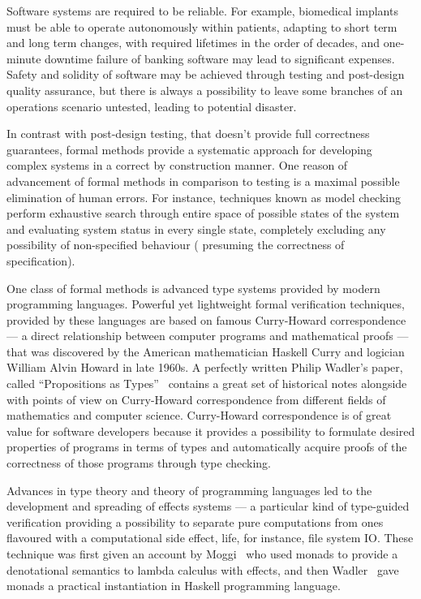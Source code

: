 \Intro

Software systems are required to be reliable. For example, biomedical implants must be able to operate autonomously within patients, adapting to short term and long term changes, with required lifetimes in the order of decades, and one-minute downtime failure of banking software may lead to significant expenses. Safety and solidity of software may be achieved through testing and post-design quality assurance, but there is always a possibility to leave some branches of an operations scenario untested, leading to potential disaster.

In contrast with post-design testing, that doesn’t provide full
correctness guarantees, formal methods provide a systematic approach for developing complex systems in a correct by construction manner. One reason of advancement of
formal methods in comparison to testing is a maximal possible elimination of human errors. For instance, techniques known as model checking perform exhaustive search
through entire space of possible states of the system and evaluating system status in
every single state, completely excluding any possibility of non-specified behaviour (
presuming the correctness of specification).

One class of formal methods is advanced type systems provided by modern programming languages. Powerful yet lightweight formal verification techniques, provided by these languages are based on famous Curry-Howard correspondence --- a direct relationship between computer programs and mathematical
proofs --- that was discovered by the American mathematician Haskell Curry and logician
William Alvin Howard in late 1960s. A perfectly written Philip Wadler’s paper,
called ``Propositions as Types''~\cite{Wadler:2015:PT:2847579.2699407}
contains a great set of historical notes alongside with points of view on
Curry-Howard correspondence from different fields of
mathematics and computer science. Curry-Howard correspondence is of great value
for software developers because it provides a possibility to formulate desired
properties of programs in terms of types and automatically acquire proofs of
the correctness of those programs through type checking.

Advances in type theory and theory of programming languages led to the development and spreading of effects systems --- a particular kind of type-guided verification providing a possibility to separate pure computations from ones flavoured with a computational side effect, life, for instance, file system IO. These technique
was first given an account by Moggi~\cite{Moggi:1991:NCM:116981.116984} who
used monads to provide a denotational semantics to lambda calculus with effects, and then Wadler~\cite{Wadler:1992:EFP:143165.143169} gave monads a practical instantiation in Haskell programming language.

